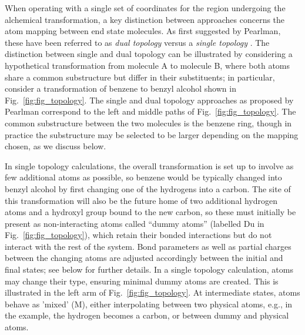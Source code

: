\documentclass[9pt,bestpractices]{livecoms}
\newcommand{\sbnote}[1]{%
  {\bfseries{}[SB: }%
  {\textcolor{blue}{#1}}{\bfseries{}]}
}
\begin{document}
When operating with a single set of coordinates for the region undergoing the alchemical transformation, a key distinction between approaches concerns the atom mapping between end state molecules. %
As first suggested by Pearlman, these have been referred to as \emph{dual topology} versus a \emph{single topology} \cite{Pearlman_1994}. The distinction between single and dual topology can be illustrated by considering a hypothetical transformation from molecule A to molecule B, where both atoms share a common substructure but differ in their substituents; in particular, consider a transformation of benzene to benzyl alcohol shown in Fig.~\ref{fig:fig_topology}. The single and dual topology approaches as proposed by Pearlman correspond to the left and middle paths of Fig.~\ref{fig:fig_topology}.  %
The common substructure between the two molecules is the benzene ring, though in practice the substructure may be selected to be larger depending on the mapping chosen, as we discuss below.

In single topology calculations, the overall transformation is set up to involve as few additional atoms as possible, so benzene would be typically changed into benzyl alcohol by first changing one of the hydrogens into a carbon. The site of this transformation will also be the future home of two additional hydrogen atoms and a hydroxyl group bound to the new carbon, so these must initially be present as non-interacting atoms called ``dummy atoms'' (labelled Du in Fig.~\ref{fig:fig_topology}), which retain their bonded interactions but do not interact with the rest of the system.  Bond parameters as well as partial charges between the changing atoms are adjusted accordingly between the initial and final states; see below for further details. In a single topology calculation, atoms may change their type, ensuring minimal dummy atoms are created. This is illustrated in the left arm of Fig.~\ref{fig:fig_topology}. At intermediate states, atoms behave as 'mixed' (M), either interpolating between two physical atoms, e.g., in the example, the hydrogen becomes a carbon, or between dummy and physical atoms.
\end{document}
